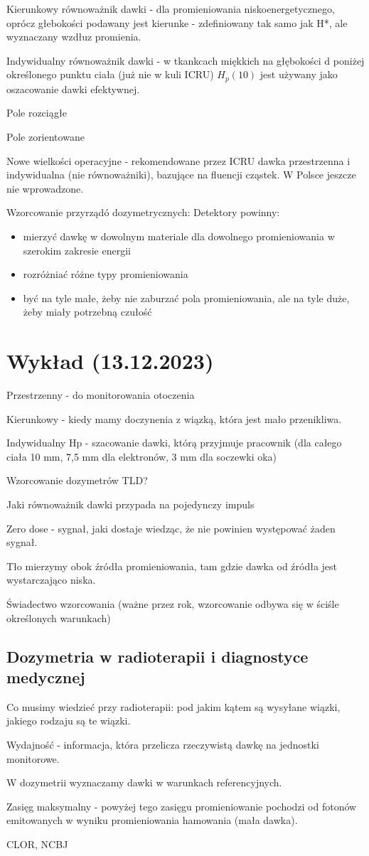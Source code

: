 \documentclass{article}
\begin{document}
Kierunkowy równoważnik dawki - dla promieniowania niskoenergetycznego, oprócz głebokości podawany jest kierunke - zdefiniowany tak samo jak H*, ale wyznaczany wzdłuz promienia.

Indywidualny równoważnik dawki - w tkankcach miękkich na głębokości d poniżej określonego punktu ciała (już nie w kuli ICRU) $H_p(10)$ jest używany jako oszacowanie dawki efektywnej.

Pole rozciągłe

Pole zorientowane

Nowe wielkości operacyjne - rekomendowane przez ICRU dawka przestrzenna i indywidualna (nie równoważniki), bazujące na fluencji cząstek. W Polsce jeszcze nie wprowadzone.

Wzorcowanie przyrządó dozymetrycznych:
Detektory powinny:
\begin{itemize}
    \item mierzyć dawkę w dowolnym materiale dla dowolnego promieniowania w szerokim zakresie energii
    \item rozróżniać różne typy promieniowania
    \item być na tyle małe, żeby nie zaburzać pola promieniowania, ale na tyle duże, żeby miały potrzebną czułość
\end{itemize}

\section{Wykład (13.12.2023)}

Przestrzenny - do monitorowania otoczenia

Kierunkowy - kiedy mamy doczynenia z wiązką, która jest mało przenikliwa.

Indywidualny Hp - szacowanie dawki, którą przyjmuje pracownik (dla całego ciała 10 mm, 7,5 mm dla elektronów, 3 mm dla soczewki oka)

Wzorcowanie dozymetrów TLD?

Jaki równoważnik dawki przypada na pojedynczy impuls

Zero dose - sygnał, jaki dostaje wiedząc, że nie powinien występować żaden sygnał.

Tło mierzymy obok źródła promieniowania, tam gdzie dawka od źródła jest wystarczająco niska.

Świadectwo wzorcowania (ważne przez rok, wzorcowanie odbywa się w ściśle określonych warunkach)

\subsection{Dozymetria w radioterapii i diagnostyce medycznej}

Co musimy wiedzieć przy radioterapii: pod jakim kątem są wysyłane wiązki, jakiego rodzaju są te wiązki.

Wydajność - informacja, która przelicza rzeczywistą dawkę na jednostki monitorowe.

W dozymetrii wyznaczamy dawki w warunkach referencyjnych.

Zasięg maksymalny - powyżej tego zasięgu promieniowanie pochodzi od fotonów emitowanych w wyniku promieniowania hamowania (mała dawka).

CLOR, NCBJ
\end{document}
